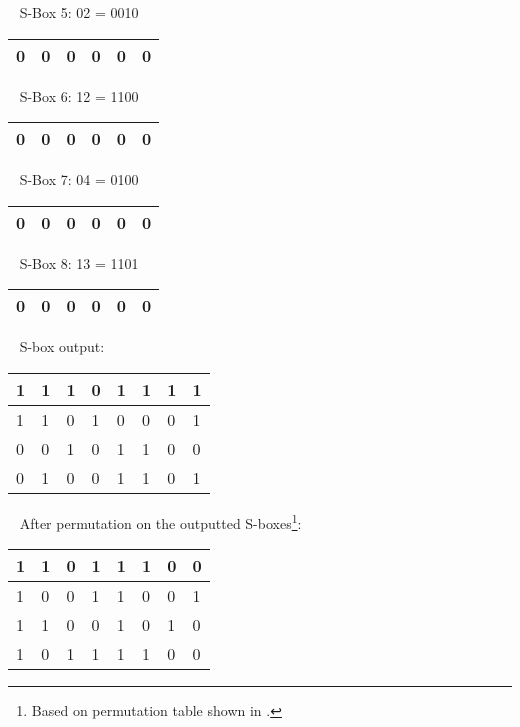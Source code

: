~
\vspace{1em}\newline
\noindent
S-Box 5: 02 = 0010 \\
\begin{tabular}{ | l | l | l | l | l | l | } \hline 
	0 & 0 & 0 & 0 & 0 &  0 \\ \hline
\end{tabular}
~
\vspace{1em}\newline
\noindent
S-Box 6: 12 = 1100 \\
\begin{tabular}{ | l | l | l | l | l | l | } \hline 
	0 & 0 & 0 & 0 & 0 &  0 \\ \hline
\end{tabular}
~
\vspace{1em}\newline
\noindent
S-Box 7: 04 = 0100 \\
\begin{tabular}{ | l | l | l | l | l | l | } \hline 
	0 & 0 & 0 & 0 & 0 &  0 \\ \hline
\end{tabular}
~
\vspace{1em}\newline
\noindent
S-Box 8: 13 = 1101 \\
\begin{tabular}{ | l | l | l | l | l | l | } \hline 
	0 & 0 & 0 & 0 & 0 &  0 \\ \hline
\end{tabular}
~
\vspace{0.5em}\newline
\noindent
S-box output: \\
\begin{tabular}{ | l | l | l | l | l | l | l |  l | } \hline 
	1 & 1 & 1 & 0 & 1 &  1 & 1 & 1 \\ \hline
	1 & 1 & 0 & 1 & 0 & 0 & 0 & 1 \\ \hline
	0 & 0 & 1 & 0 & 1 &  1 & 0 & 0 \\ \hline
	0 & 1 & 0 & 0 & 1 &  1 & 0 & 1 \\ \hline
\end{tabular}
~
\vspace{0.5em}\newline
\noindent
After permutation on the outputted S-boxes\footnote{Based on permutation table shown in \cite[p.~66]{Paar2010}.}: \\
\begin{tabular}{ | l | l | l | l | l | l | l |  l | } \hline 
	1 & 1 & 0 & 1 & 1 &  1 & 0 & 0 \\ \hline
	1 & 0 & 0 & 1 & 1 &  0 & 0 & 1 \\ \hline
	1 & 1 & 0 & 0 & 1 &  0 & 1 & 0 \\ \hline
	1 & 0 & 1 & 1 & 1 &  1 & 0 & 0 \\ \hline
\end{tabular}

